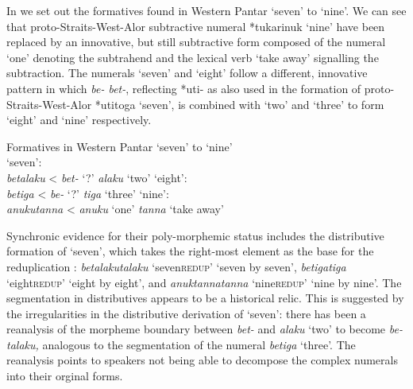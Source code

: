 In  we set out the formatives found in Western Pantar `seven' to `nine'. We can see that proto-Straits-West-Alor subtractive numeral *tukarinuk `nine' have been replaced by an innovative, but still subtractive form composed of the numeral `one' denoting the subtrahend and the lexical verb `take away' signalling the subtraction. The numerals `seven' and `eight' follow a different, innovative pattern in which \textit{be- {\Tilde} bet-}, reflecting *{\texthtb}uti- as also used in the formation of proto-Straits-West-Alor *{\texthtb}utitoga `seven', is combined with `two' and `three' to form `eight' and `nine' respectively. 



\ea%
\label{ex:6:11}
\upshape Formatives in Western Pantar `seven' to `nine'\\
\ea \upshape `seven':\\
\textit{betalaku}    {\textless}  \textit{bet-} `?'   \textit{alaku} `two'  
\ex \upshape  `eight':\\
\textit{betiga}      {\textless}  \textit{be-} `?'     \textit{tiga} `three'
\ex  \upshape  `nine':\\
\textit{anukutanna}\textit{{\ng}}   {\textless}  \textit{anuku} `one'   \textit{tanna}\textit{{\ng}} `take away'
\z
\z

Synchronic evidence for their poly-morphemic status includes the distributive formation of `seven', which takes the right-most element as the base for the reduplication \citet{KlamerSchapperCorbettTVnumeralwords}: \textit{betalaku{\Tilde}talaku} `seven\textsc{{\Tilde}redup}' `seven by seven', \textit{betiga{\Tilde}tiga} `eight\textsc{{\Tilde}redup}' `eight by eight', and \textit{anuktanna}\textit{{\ng}}\textit{{\Tilde}tanna}\textit{{\ng}} `nine\textsc{{\Tilde}redup}' `nine by nine'. The segmentation in distributives appears to be a historical relic. This is suggested by the irregularities in the distributive derivation of `seven': there has been a reanalysis of the morpheme boundary between \textit{bet-} and \textit{alaku} `two' to become \textit{be-talaku,} analogous to the segmentation of the numeral \textit{betiga} `three'. The reanalysis points to speakers not being able to decompose the complex numerals into their orginal forms.

